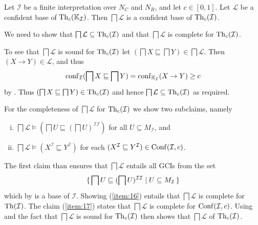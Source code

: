 \begin{Theorem}
  \label{thm:confident-bases-of-GCIs-from-confident-bases-of-implications}
  Let $\mathcal{I}$ be a finite interpretation over $N_C$ and $N_R$, and let $c \in
  [0,1]$.  Let $\mathcal{L}$ be a confident base of $\operatorname{Th}_c({\mathbb{K}}_{\mathcal{I}})$.  Then
  $\bigsqcap \mathcal{L}$ is a confident base of $\operatorname{Th}_c(\mathcal{I})$.
\end{Theorem}
\begin{Proof}
  We need to show that $\bigsqcap \mathcal{L} \subseteq \operatorname{Th}_c(\mathcal{I})$ and that
  $\bigsqcap \mathcal{L}$ is complete for $\operatorname{Th}_c(\mathcal{I})$.

  To see that $\bigsqcap \mathcal{L}$ is sound for $\operatorname{Th}_c(\mathcal{I})$ let $(\bigsqcap X
  \sqsubseteq \bigsqcap Y) \in \bigsqcap \mathcal{L}$.  Then $(X \to Y) \in \mathcal{L}$,
  and thus
  \begin{equation*}
    \operatorname{conf}_{\mathcal{I}}(\bigsqcap X \sqsubseteq \bigsqcap Y) = \operatorname{conf}_{{\mathbb{K}}_{\mathcal{I}}}(X \to Y) \ge c
  \end{equation*}
  by .  Thus
  $(\bigsqcap X \sqsubseteq \bigsqcap Y) \in \operatorname{Th}_c(\mathcal{I})$ and hence $\bigsqcap
  \mathcal{L} \subseteq \operatorname{Th}_c(\mathcal{I})$ as required.

  For the completeness of $\bigsqcap \mathcal{L}$ for $\operatorname{Th}_c(\mathcal{I})$ we show two
  subclaims, namely
  \begin{enumerate}[i. ]
  \item\label{item:16} $\bigsqcap \mathcal{L} \models (\bigsqcap U \sqsubseteq (\bigsqcap
    U)^{\mathcal{I}\mathcal{I}})$ for all $U \subseteq M_{\mathcal{I}}$, and
  \item\label{item:17} $\bigsqcap \mathcal{L} \models (X^{\mathcal{I}} \sqsubseteq
    Y^{\mathcal{I}})$ for each $(X^{\mathcal{I}} \sqsubseteq Y^{\mathcal{I}}) \in
    \operatorname{Conf}(\mathcal{I}, c)$.
  \end{enumerate}
  The first claim than ensures that $\bigsqcap \mathcal{L}$ entails all GCIs from the set
  \begin{equation*}
    {\ensuremath{\{\, \bigsqcap U \sqsubseteq (\bigsqcap U)^{\mathcal{I}\mathcal{I}} \mid U \subseteq
      M_{\mathcal{I}} \,\}}}
  \end{equation*}
  which by  is a base of $\mathcal{I}$.  Showing (\ref{item:16})
  entails that $\bigsqcap \mathcal{L}$ is complete for $\operatorname{Th}(\mathcal{I})$.  The claim
  (\ref{item:17}) states that $\bigsqcap \mathcal{L}$ is complete for $\operatorname{Conf}(\mathcal{I},
  c)$.  Using  and the fact that $\bigsqcap
  \mathcal{L}$ is sound for $\operatorname{Th}_c(\mathcal{I})$ then shows that $\bigsqcap \mathcal{L}$
  of $\operatorname{Th}_c(\mathcal{I})$.


\end{Proof}
